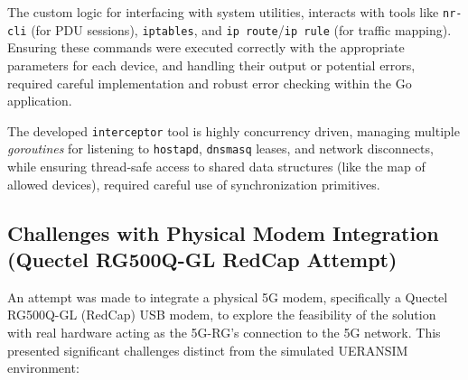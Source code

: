 The custom logic for interfacing with system utilities, interacts with tools like \texttt{nr-cli} (for \ac{PDU} sessions), \texttt{iptables}, and \texttt{ip route}/\texttt{ip rule} (for traffic mapping). Ensuring these commands were executed correctly with the appropriate parameters for each device, and handling their output or potential errors, required careful implementation and robust error checking within the Go application.

The developed \texttt{interceptor} tool is highly concurrency driven, managing multiple \textit{goroutines} for listening to \texttt{hostapd}, \texttt{dnsmasq} leases, and network disconnects, while ensuring thread-safe access to shared data structures (like the map of allowed devices), required careful use of synchronization primitives.

\subsection{Challenges with Physical Modem Integration (Quectel RG500Q-GL RedCap Attempt)}

An attempt was made to integrate a physical \ac{5G} modem, specifically a Quectel RG500Q-GL (RedCap) \ac{USB} modem, to explore the feasibility of the solution with real hardware acting as the \ac{5G-RG}'s connection to the \ac{5G} network. This presented significant challenges distinct from the simulated UERANSIM environment:

